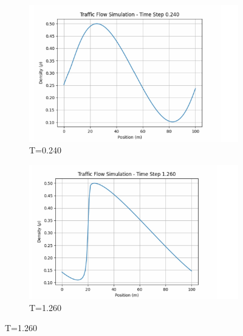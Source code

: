 \documentclass{article}
\begin{document}
	
	\begin{figure}[H]
		\centering
		\begin{subfigure}{0.4\textwidth}
			\centering
			\includegraphics[width=\textwidth]{AniE1.jpg}
			\caption{T=0.240}
			\label{fig:graph1}
		\end{subfigure}
		\begin{subfigure}{0.4\textwidth}
			\centering
			\includegraphics[width=\textwidth]{AniE2.jpg}
			\caption{T=1.260}
			\label{fig:graph2}
		\end{subfigure}
		
		\vspace{0.5cm}
		

\end{figure}
\end{document}
